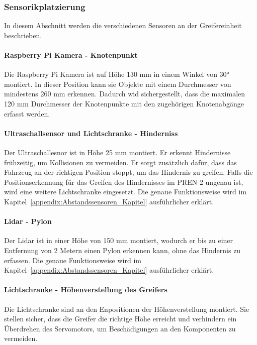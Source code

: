 \documentclass[main.tex]{subfiles} %
\begin{document}
\newpage

\subsubsection*{Sensorikplatzierung}

In diesem Abschnitt werden die verschiedenen Sensoren an der Greifereinheit beschrieben.

\paragraph{Raspberry Pi Kamera - Knotenpunkt}
Die Raspberry Pi Kamera ist auf Höhe 130 mm in einem Winkel von 30° montiert.
In dieser Position kann sie Objekte mit einem Durchmesser von mindestens 260 mm erkennen.
Dadurch wid sichergestellt, dass die maximalen 120 mm Durchmesser der Knotenpunkte mit den zugehörigen
Knotenabgänge erfasst werden.


\paragraph{Ultraschallsensor und Lichtschranke - Hinderniss}
Der Ultraschallesnor ist in Höhe 25 mm montiert. Er erkennt Hindernisse frühzeitig,
um Kollisionen zu vermeiden. Er sorgt zusätzlich dafür, dass das Fahrzeug an der richtigen 
Position stoppt, um das Hindernis zu greifen. Falls die Positionserkennung für das Greifen 
des Hindernisses im PREN 2 ungenau ist, wird eine weitere Lichtschranke eingesetzt.
Die genaue Funktionsweise wird im Kapitel~\ref{appendix:Abstandssensoren_Kapitel} ausführlicher erklärt.

\paragraph{Lidar - Pylon}
Der Lidar ist in einer Höhe von 150 mm montiert, wodurch er bis zu einer Entfernung
von 2 Metern einen Pylon erkennen kann, ohne das Hindernis zu erfassen.
Die genaue Funktionsweise wird im Kapitel~\ref{appendix:Abstandssensoren_Kapitel} ausführlicher erklärt.

\paragraph{Lichtschranke - Höhenverstellung des Greifers}

Die Lichtschranke sind an den Enpositionen der Höhenverstellung montiert.
Sie stellen sicher, dass die Greifer die richtige Höhe erreicht und verhindern
ein Überdrehen des Servomotors, um Beschädigungen an den Komponenten zu vermeiden.
\end{document}
